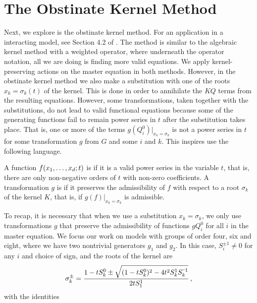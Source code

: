 
\chapter{The Obstinate Kernel Method}
\label{ch:OKM}

Next, we explore is the obstinate kernel method. For an application in a \twoD interacting model, see Section 4.2 of \cite[p.~16]{tabbara2014exact}. The method is similar to the algebraic kernel method  with a weighted operator, where underneath the operator notation, all we are doing is finding more valid equations. We apply kernel-preserving actions on the master equation in both methods. However, in the obstinate kernel method we also make a substitution with one of the roots $x_k = \sigma_k(t)$ of the kernel. This is done in order to annihilate the $KQ$ terms from the resulting equations. However, some transformations, taken together with the substitutions, do not lead to valid functional equations because some of the generating functions fail to remain power series in $t$ after the substitution takes place. That is, one or more of the terms $g(Q_i^0)|_{x_k = \sigma_k}$ is not a power series in $t$ for some transformation $g$ from $G$ and some $i$ and $k$. This inspires use the following language.

\begin{defn} A function $f(x_1,\ldots, x_d;t)$ is  if it is a valid power series in the variable $t$, that is, there are only non-negative orders of $t$ with non-zero coefficients. A transformation $g$ is  if it preserves the admissibility of $f$ with respect to a root $\sigma_k$ of the kernel $K$, that is, if $g(f)|_{x_k = \sigma_k}$ is admissible.
\end{defn}

To recap, it is necessary that when we use a substitution $x_k = \sigma_k$,  we only use transformations $g$ that preserve the admissibility of functions $g Q_i^0$ for all $i$ in the master equation. We focus our work on models with groups of order four, six and eight, where we have two nontrivial generators $g_1$ and $g_2$. In this case, $S_i^{\pm 1} \neq 0$ for any $i$ and choice of sign, and the roots of the kernel are
\begin{align}
	\sigma_{k}^{\pm} = \frac{1-t S_k^0 \pm \sqrt{(1 - t S_k^0)^2-4t^2 S_k^1 S_k^{\um 1}}}{2t S_1^1}\,,
\end{align}
with the identities

